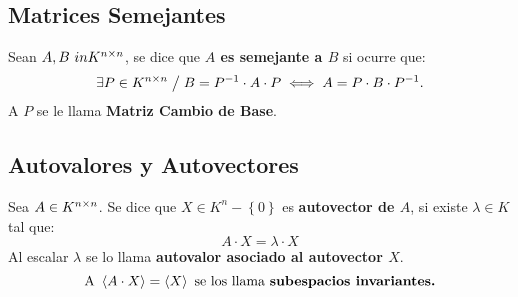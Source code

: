 \subsection{Matrices Semejantes}
Sean $ A,B\ in K^{n \times n} $, se dice que \textbf{$A$ es semejante a $B$} si ocurre que:
\[
    \exists  P \in K^{n \times n}  \; \big/ \; B = P^{-1} \cdot A \cdot P \iff A = P \cdot B \cdot P^{-1}.  
\]
A $ P $ se le llama \textbf{Matriz Cambio de Base}.
\subsection{Autovalores y Autovectores}
Sea $ A \in K^{n \times n} $. Se dice que $ X \in K^{n} - \left\{ 0 \right\} $ es \textbf{autovector de $A$}, si existe $ \lambda \in K $ tal que:
\[
    A \cdot X = \lambda \cdot X
\]
Al escalar $\lambda$ se lo llama \textbf{autovalor asociado al autovector $X$}.
\[
\text{A } \left<A \cdot X\right> = \left<X\right> \text{ se los llama \textbf{subespacios invariantes.}}\]
